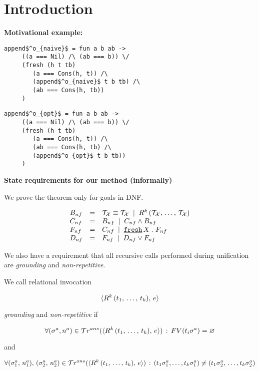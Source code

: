 \section{Introduction}
\label{sec:intro}

\colorbox{red!20}{\textbf{Motivational example:}}
\begin{lstlisting}[basicstyle=\small]
   append$^o_{naive}$ = fun a b ab ->
     ((a === Nil) /\ (ab === b)) \/
     (fresh (h t tb)
        (a === Cons(h, t)) /\
        (append$^o_{naive}$ t b tb) /\
        (ab === Cons(h, tb)) 
     )
\end{lstlisting}

\begin{lstlisting}[basicstyle=\small]
   append$^o_{opt}$ = fun a b ab ->
     ((a === Nil) /\ (ab === b)) \/
     (fresh (h t tb)
        (a === Cons(h, t)) /\
        (ab === Cons(h, tb) /\
        (append$^o_{opt}$ t b tb)) 
     )
\end{lstlisting}

\colorbox{red!20}{\parbox{\textwidth}{\textbf{State requirements for our method (informally)}}}

We prove the theorem only for goals in DNF.

\[
\begin{array}{lcl}
B_{nf} & = &  \mathcal{T}_\mathcal{X} \equiv \mathcal{T}_\mathcal{X} \; \mid \;
                     R^k\,(\mathcal{T}_\mathcal{X}, \, \dots, \, \mathcal{T}_\mathcal{X}) \\
C_{nf} & = & B_{nf} \; \mid \; C_{nf} \land B_{nf} \\
F_{nf} & = & C_{nf} \; \mid \; \texttt{\underline {fresh}} \, X\;.\; F_{nf} \\
D_{nf} & = & F_{nf} \; \mid \; D_{nf} \lor F_{nf}
\end{array}
\]

We also have a requirement that all recursive calls performed during unification are \emph{grounding} and \emph{non-repetitive}.

\begin{definition}
  We call relational invocation
  
  \[\langle R^k\,(t_1, \, \dots, \, t_k) ,\, e \rangle\]

  \emph{grounding} and \emph{non-repetitive} if 

  \[ \forall (\sigma^{a}, n^{a}) \in \mathcal{T}r^{ans}(\langle R^k\,(t_1, \, \dots, \, t_k) ,\, e \rangle) \,:\, FV(t_i \sigma^{a}) = \varnothing \]

  and
  
  \[ \forall (\sigma_1^{a},\, n_1^{a}),\, (\sigma_2^{a},\, n_2^{a}) \in \mathcal{T}r^{ans}(\langle R^k\,(t_1, \, \dots, \, t_k) ,\, e \rangle) \,:\, (t_1 \sigma_1^{a}, \dots, t_k \sigma_1^{a}) \ne (t_1 \sigma_2^{a},\, \dots, t_k \sigma_2^{a}) \]
\end{definition}

